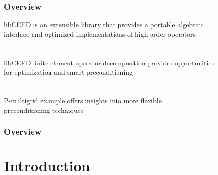 \documentclass{beamer}
\begin{document}
\begin{frame}
\begin{center}
\frametitle{Overview}

libCEED is an extensible library that provides a portable algebraic\\
interface and optimized implementations of high-order operators\\

~\\

~\\

libCEED finite element operator decomposition provides opportunities\\for optimization and smart preconditioning\\

~\\

~\\

P-multigrid example offers insights into more flexible\\preconditioning techniques

\end{center}
\end{frame}
 

\begin{frame}
\frametitle{Overview} %
\tableofcontents %
\end{frame}


\section{Introduction}
\end{document}
